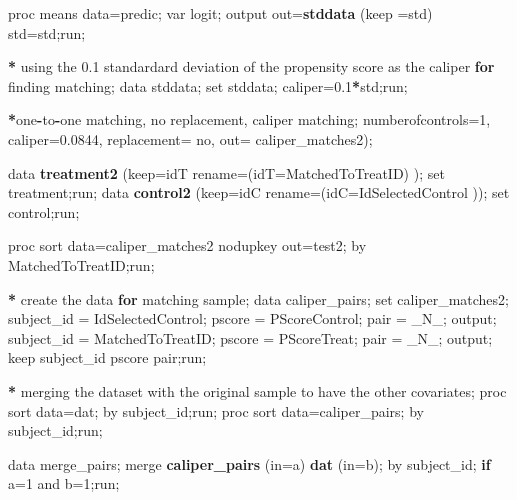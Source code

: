 \documentclass[]{article}
\newenvironment{Shaded}{\begin{snugshade}}{\end{snugshade}}
\newcommand{\KeywordTok}[1]{\textcolor[rgb]{0.13,0.29,0.53}{\textbf{#1}}}
\newcommand{\DataTypeTok}[1]{\textcolor[rgb]{0.13,0.29,0.53}{#1}}
\newcommand{\DecValTok}[1]{\textcolor[rgb]{0.00,0.00,0.81}{#1}}
\newcommand{\FloatTok}[1]{\textcolor[rgb]{0.00,0.00,0.81}{#1}}
\newcommand{\StringTok}[1]{\textcolor[rgb]{0.31,0.60,0.02}{#1}}
\newcommand{\ControlFlowTok}[1]{\textcolor[rgb]{0.13,0.29,0.53}{\textbf{#1}}}
\newcommand{\OperatorTok}[1]{\textcolor[rgb]{0.81,0.36,0.00}{\textbf{#1}}}
\newcommand{\NormalTok}[1]{#1}
\begin{document}
\begin{Shaded}
\begin{Highlighting}[]
{\NormalTok{proc means data=predic; var logit; output out=}\KeywordTok{stddata}\NormalTok{ (}\DataTypeTok{keep =}\NormalTok{std) std=std;run; }

\OperatorTok{*}\StringTok{ }\NormalTok{using the }\FloatTok{0.1}\NormalTok{ standardard deviation of the propensity score as the caliper }\ControlFlowTok{for}\NormalTok{ finding matching; }
\NormalTok{data stddata; set stddata; caliper=}\FloatTok{0.1}\OperatorTok{*}\NormalTok{std;run;  }


\OperatorTok{*}\NormalTok{one}\OperatorTok{-}\NormalTok{to}\OperatorTok{-}\NormalTok{one matching, no replacement, caliper matching; }
\NormalTok{%}\KeywordTok{PSMatching}\NormalTok{(}\DataTypeTok{datatreatment=}\NormalTok{ treatment, }\DataTypeTok{datacontrol=}\NormalTok{ control, }\DataTypeTok{method=}\NormalTok{ CALIPER,}
      \DataTypeTok{numberofcontrols=}\DecValTok{1}\NormalTok{, }\DataTypeTok{caliper=}\FloatTok{0.0844}\NormalTok{, }\DataTypeTok{replacement=}\NormalTok{ no, }\DataTypeTok{out=}\NormalTok{ caliper_matches2);  }


\NormalTok{data }\KeywordTok{treatment2}\NormalTok{ (}\DataTypeTok{keep=}\NormalTok{idT  }\DataTypeTok{rename=}\NormalTok{(}\DataTypeTok{idT=}\NormalTok{MatchedToTreatID) ); set treatment;run;}
\NormalTok{data }\KeywordTok{control2}\NormalTok{ (}\DataTypeTok{keep=}\NormalTok{idC  }\DataTypeTok{rename=}\NormalTok{(}\DataTypeTok{idC=}\NormalTok{IdSelectedControl  )); set control;run;}

\NormalTok{proc sort data=caliper_matches2 nodupkey out=test2; by MatchedToTreatID;run;   }

\OperatorTok{*}\StringTok{ }\NormalTok{create the data }\ControlFlowTok{for}\NormalTok{ matching sample; }
\NormalTok{data caliper_pairs;}
\NormalTok{    set  caliper_matches2;}
\NormalTok{    subject_id =}\StringTok{ }\NormalTok{IdSelectedControl; pscore =}\StringTok{ }\NormalTok{PScoreControl; pair =}\StringTok{ }\NormalTok{_N_;}
\NormalTok{    output;}
\NormalTok{    subject_id =}\StringTok{ }\NormalTok{MatchedToTreatID; pscore =}\StringTok{ }\NormalTok{PScoreTreat; pair =}\StringTok{ }\NormalTok{_N_;}
\NormalTok{    output;}
\NormalTok{    keep subject_id  pscore pair;run;}

\OperatorTok{*}\StringTok{ }\NormalTok{merging the dataset with the original sample to have the other covariates; }
\NormalTok{proc sort data=dat; by subject_id;run;}
\NormalTok{proc sort data=caliper_pairs; by subject_id;run;}

\NormalTok{data merge_pairs; }
\NormalTok{   merge }\KeywordTok{caliper_pairs}\NormalTok{ (}\DataTypeTok{in=}\NormalTok{a) }\KeywordTok{dat}\NormalTok{ (}\DataTypeTok{in=}\NormalTok{b); }
\NormalTok{   by subject_id;}
   \ControlFlowTok{if}\NormalTok{ a=}\DecValTok{1}\NormalTok{ and b=}\DecValTok{1}\NormalTok{;run;}


}}
\end{Highlighting}
\end{Shaded}
\end{document}
